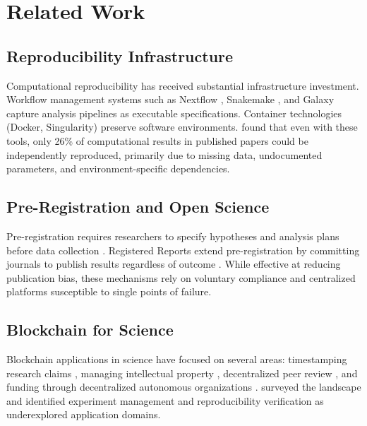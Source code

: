 \documentclass[11pt,a4paper]{article}
\begin{document}
\section{Related Work}
\label{sec:related}

\subsection{Reproducibility Infrastructure}

Computational reproducibility has received substantial infrastructure investment.
Workflow management systems such as Nextflow \citep{ditommaso2017nextflow}, Snakemake \citep{molder2021sustainable}, and Galaxy \citep{afgan2018galaxy} capture analysis pipelines as executable specifications.
Container technologies (Docker, Singularity) preserve software environments.
\citet{stodden2018empirical} found that even with these tools, only 26\% of computational results in published papers could be independently reproduced, primarily due to missing data, undocumented parameters, and environment-specific dependencies.

\subsection{Pre-Registration and Open Science}

Pre-registration requires researchers to specify hypotheses and analysis plans before data collection \citep{nosek2018preregistration}.
Registered Reports extend pre-registration by committing journals to publish results regardless of outcome \citep{chambers2013registered}.
While effective at reducing publication bias, these mechanisms rely on voluntary compliance and centralized platforms susceptible to single points of failure.

\subsection{Blockchain for Science}

Blockchain applications in science have focused on several areas: timestamping research claims \citep{koepsell2020blockchain}, managing intellectual property \citep{hasan2019blockchain}, decentralized peer review \citep{tenorio2019open}, and funding through decentralized autonomous organizations \citep{wright2021desci}.
\citet{bartling2020blockchain} surveyed the landscape and identified experiment management and reproducibility verification as underexplored application domains.
\end{document}
